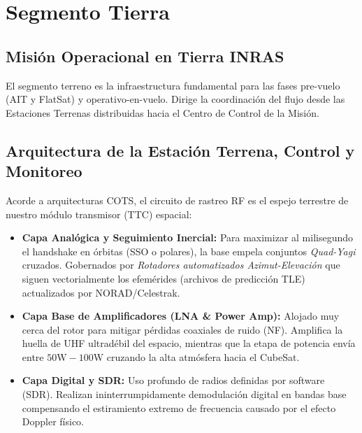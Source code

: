 \chapter{Segmento Tierra}

\section{Misión Operacional en Tierra INRAS}
El segmento terreno es la infraestructura fundamental para las fases pre-vuelo (AIT y FlatSat) y operativo-en-vuelo. Dirige la coordinación del flujo desde las Estaciones Terrenas distribuidas hacia el Centro de Control de la Misión.

\section{Arquitectura de la Estación Terrena, Control y Monitoreo}
Acorde a arquitecturas COTS, el circuito de rastreo RF es el espejo terrestre de nuestro módulo transmisor (TTC) espacial:
\begin{itemize}
    \item \textbf{Capa Analógica y Seguimiento Inercial:} Para maximizar al milisegundo el handshake en órbitas (SSO o polares), la base empela conjuntos \textit{Quad-Yagi} cruzados. Gobernados por \textit{Rotadores automatizados Azimut-Elevación} que siguen vectorialmente los efemérides (archivos de predicción TLE) actualizados por NORAD/Celestrak. 
    \item \textbf{Capa Base de Amplificadores (LNA \& Power Amp):} Alojado muy cerca del rotor para mitigar pérdidas coaxiales de ruido (NF). Amplifica la huella de UHF ultradébil del espacio, mientras que la etapa de potencia envía entre $50\text{W}-100\text{W}$ cruzando la alta atmósfera hacia el CubeSat.
    \item \textbf{Capa Digital y SDR:} Uso profundo de radios definidas por software (SDR). Realizan ininterrumpidamente demodulación digital en bandas base compensando el estiramiento extremo de frecuencia causado por el efecto Doppler físico.
\end{itemize}

